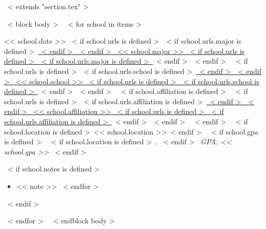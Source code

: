 ~< extends "section.tex" >~

~< block body >~
  ~< for school in items >~
    \begin{samepage}
      \cventry
        {<< school.date >>}
        {~< if school.urls is defined >~~< if school.urls.major is defined >~\href{school.urls.major}{~< endif >~~< endif >~%
           << school.major >>%
         ~< if school.urls is defined >~~< if school.urls.major is defined >~}~< endif >~~< endif >~}
        {~< if school.urls is defined >~~< if school.urls.school is defined >~\href{school.urls.school}{~< endif >~~< endif >~%
           << school.school >>%
         ~< if school.urls is defined >~~< if school.urls.school is defined >~}~< endif >~~< endif >~}
        {~< if school.affiliation is defined >~%
           ~< if school.urls is defined >~~< if school.urls.affiliation is defined >~\href{school.urls.affiliation}{~< endif >~~< endif >~%
             << school.affiliation >>%
           ~< if school.urls is defined >~~< if school.urls.affiliation is defined >~}~< endif >~~< endif >~%
         ~< endif >~}
        {~< if school.location is defined >~<< school.location >>~< endif >~%
         ~< if school.gpa is defined >~%
           ~< if school.location is defined >~. ~< endif >~%
           \textit{GPA: << school.gpa >>}%
         ~< endif >~}
        {~< if school.notes is defined >~\begin{itemize}
             ~< for note in school.notes >~
               \item{<< note >>}
             ~< endfor >~
           \end{itemize}~< endif >~}
    \end{samepage}
  ~< endfor >~
~< endblock body >~
